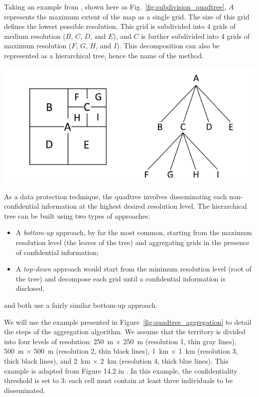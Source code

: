 \begin{tcolorbox}[breakable]
Taking an example from \cite{Lagonigro_Oller_Martori_2017}, shown here as Fig.~\ref{fig:subdivision_quadtree}, $A$ represents the maximum extent of the map as a single grid. The size of this grid defines the lowest possible resolution. This grid is subdivided into $4$ grids of medium resolution ($B$, $C$, $D$, and $E$), and $C$ is further subdivided into 4 grids of maximum resolution ($F$, $G$, $H$, and $I$). This decomposition can also be represented as a hierarchical tree, hence the name of the method.

    \includegraphics[width=0.8\linewidth]{figures/Quadtree/space_subdivision_lagonigro_fig1.png}
    \label{fig:subdivision_quadtree}
\end{tcolorbox}

As a data protection technique, the quadtree involves disseminating each non-confidential information at the highest desired resolution level. The hierarchical tree can be built using two types of approaches:
\begin{itemize}
\item A \emph{bottom-up} approach, by far the most common, starting from the maximum resolution level (the leaves of the tree) and aggregating grids in the presence of confidential information;
\item A \emph{top-down} approach would start from the minimum resolution level (root of the tree) and decompose each grid until a confidential information is disclosed.
\end{itemize}

\cite{Behnisch_Meinel_Tramsen_Diesselmann_2013} and \cite{Lagonigro_Oller_Martori_2017} both use a fairly similar bottom-up approach.

We will use the example presented in Figure~\ref{fig:quadtree_aggregation} to detail the steps of the aggregation algorithm. We assume that the territory is divided into four levels of resolution: 250~m $\times$ 250~m (resolution 1, thin gray lines), 500~m $\times$ 500~m (resolution 2, thin black lines), 1~km $\times$ 1~km (resolution 3, thick black lines), and 2~km $\times$ 2~km (resolution 4, thick blue lines). This example is adapted from Figure 14.2 in \citet[p.358]{BuronFontaine2018}. In this example, the confidentiality threshold is set to $3$: each cell must contain at least three individuals to be disseminated.

